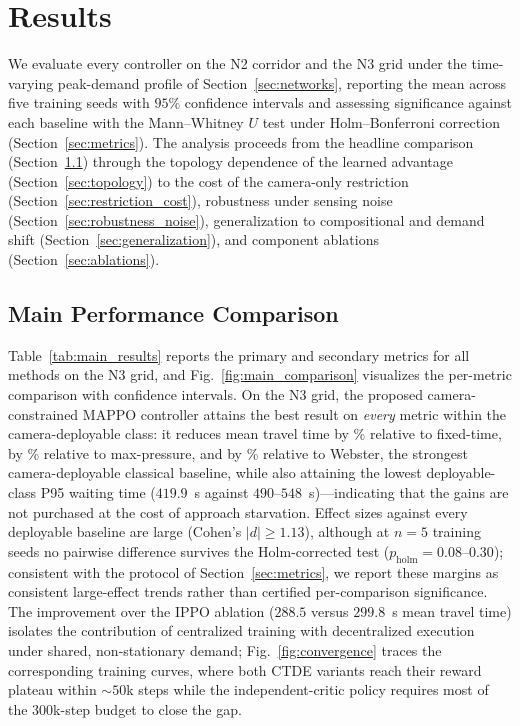 \section{Results}
\label{sec:results}

We evaluate every controller on the N2 corridor and the N3 grid under the time-varying
peak-demand profile of Section~\ref{sec:networks}, reporting the mean across five training
seeds with $95\%$ confidence intervals and assessing significance against each baseline
with the Mann--Whitney $U$ test under Holm--Bonferroni correction
(Section~\ref{sec:metrics}). The analysis proceeds from the headline comparison
(Section~\ref{sec:res_quantitative}) through the topology dependence of the learned advantage
(Section~\ref{sec:topology}) to the cost of the camera-only restriction
(Section~\ref{sec:restriction_cost}), robustness under sensing noise
(Section~\ref{sec:robustness_noise}), generalization to compositional and demand shift
(Section~\ref{sec:generalization}), and component ablations (Section~\ref{sec:ablations}).

\subsection{Main Performance Comparison}
\label{sec:res_quantitative}
Table~\ref{tab:main_results} reports the primary and secondary metrics for all methods on the
N3 grid, and Fig.~\ref{fig:main_comparison} visualizes the per-metric comparison with
confidence intervals. On the N3 grid, the proposed camera-constrained MAPPO controller attains
the best result on \emph{every} metric within the camera-deployable class: it reduces mean
travel time by \ImproveFixed\% relative to fixed-time, by \ImproveMaxP\% relative to
max-pressure, and by \ImproveStrongest\% relative to Webster, the strongest camera-deployable
classical baseline, while also attaining the lowest deployable-class P95 waiting time
($419.9$~s against $490$--$548$~s)---indicating that the gains are not purchased at the cost
of approach starvation. Effect sizes against every deployable baseline are large
(Cohen's $|d| \geq 1.13$), although at $n{=}5$ training seeds no pairwise difference survives
the Holm-corrected test ($p_{\mathrm{holm}} = 0.08$--$0.30$); consistent with the protocol of
Section~\ref{sec:metrics}, we report these margins as consistent large-effect trends rather
than certified per-comparison significance. The improvement over the IPPO ablation
($288.5$ versus $299.8$~s mean travel time) isolates the contribution of centralized training
with decentralized execution under shared, non-stationary demand;
Fig.~\ref{fig:convergence} traces the corresponding training curves, where both CTDE variants
reach their reward plateau within ${\sim}50$k steps while the independent-critic policy
requires most of the $300$k-step budget to close the gap.

